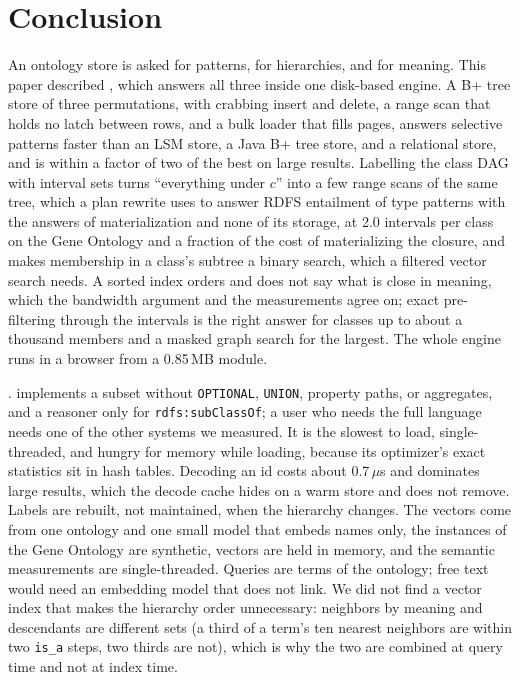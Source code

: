 \section{Conclusion}
\label{sec-conclude}

An ontology store is asked for patterns, for hierarchies, and for meaning.
This paper described \sys, which answers all three inside one disk-based
engine.
A B+ tree store of three permutations, with crabbing insert and delete, a range
scan that holds no latch between rows, and a bulk loader that fills pages,
answers selective patterns faster than an LSM store, a Java B+ tree store, and a
relational store, and is within a factor of two of the best on large results.
Labelling the class DAG with interval sets turns ``everything under $c$'' into
a few range scans of the same tree, which a plan rewrite uses to answer RDFS
entailment of type patterns with the answers of materialization and none of its
storage, at 2.0 intervals per class on the Gene
Ontology and a fraction of the cost of materializing the closure, and makes
membership in a class's subtree a binary search, which a filtered vector search
needs.
A sorted index orders and does not say what is close in meaning, which the
bandwidth argument and the measurements agree on; exact pre-filtering through
the intervals is the right answer for classes up to about a thousand members
and a masked graph search for the largest.
The whole engine runs in a browser from a 0.85\,MB module.

.
\sys implements a \sparql subset without \texttt{OPTIONAL}, \texttt{UNION},
property paths, or aggregates, and a reasoner only for
\texttt{rdfs:subClassOf}; a user who needs the full language needs one of the
other systems we measured.
It is the slowest to load, single-threaded, and hungry for memory while
loading, because its optimizer's exact statistics sit in hash tables.
Decoding an id costs about 0.7\,$\mu$s and dominates large results, which the
decode cache hides on a warm store and does not remove.
Labels are rebuilt, not maintained, when the hierarchy changes.
The vectors come from one ontology and one small model that embeds names only,
the instances of the Gene Ontology are synthetic, vectors are held in memory,
and the semantic measurements are single-threaded.
Queries are terms of the ontology; free text would need an embedding model that
\sys does not link.
We did not find a vector index that makes the hierarchy order unnecessary:
neighbors by meaning and descendants are different sets (a third of a term's
ten nearest neighbors are within two \texttt{is\_a} steps, two thirds are
not), which is why the two are combined at query time and not at index time.
